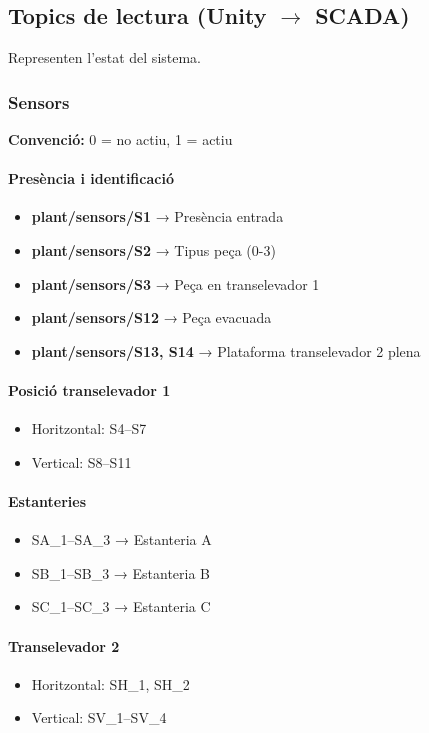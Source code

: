 \documentclass[12pt,a4paper]{report}
\begin{document}
\subsection{Topics de lectura (Unity $\rightarrow$ SCADA)}

Representen l'estat del sistema.

\subsubsection{Sensors}

\textbf{Convenció:} 0 = no actiu, 1 = actiu

\paragraph{Presència i identificació}
\begin{itemize}
\item \textbf{plant/sensors/S1} → Presència entrada
\item \textbf{plant/sensors/S2} → Tipus peça (0-3)
\item \textbf{plant/sensors/S3} → Peça en transelevador 1
\item \textbf{plant/sensors/S12} → Peça evacuada
\item \textbf{plant/sensors/S13, S14} → Plataforma transelevador 2 plena
\end{itemize}

\paragraph{Posició transelevador 1}
\begin{itemize}
\item Horitzontal: S4–S7
\item Vertical: S8–S11
\end{itemize}

\paragraph{Estanteries}
\begin{itemize}
\item SA\_1–SA\_3 → Estanteria A
\item SB\_1–SB\_3 → Estanteria B
\item SC\_1–SC\_3 → Estanteria C
\end{itemize}

\paragraph{Transelevador 2}
\begin{itemize}
\item Horitzontal: SH\_1, SH\_2
\item Vertical: SV\_1–SV\_4
\end{itemize}
\end{document}
